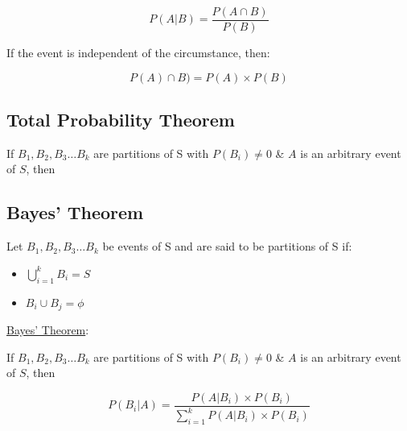 \documentclass[./EngineeringMaths.tex]{subfiles}
\begin{document}
\[P(A|B) = \frac{P(A\cap B)}{P(B)}\]

If the event is independent of the circumstance, then:

\[P(A)\cap B) = P(A) \times P(B)\]

\subsection*{Total Probability Theorem}

If $B_1,B_2,B_3\dots B_k$ are partitions of S with $P(B_i) \neq 0$ \& $A$ is an arbitrary event of $S$, then


\subsection{Bayes' Theorem}
Let $B_1,B_2,B_3\dots B_k$ be events of S and are said to be partitions of S if:

\begin{itemize}
\item $\bigcup\limits_{i=1}^k B_i = S$
\item $B_i \cup B_j = \phi$
\end{itemize}

\underline{Bayes' Theorem}: 

If $B_1,B_2,B_3\dots B_k$ are partitions of S with $P(B_i) \neq 0$ \& $A$ is an arbitrary event of $S$, then

\begin{equation*}
P(B_i|A) = \frac{P(A|B_i)\times P(B_i)}{\sum\limits_{i=1}^k P(A|B_i)\times P(B_i)}
\end{equation*}
\end{document}
